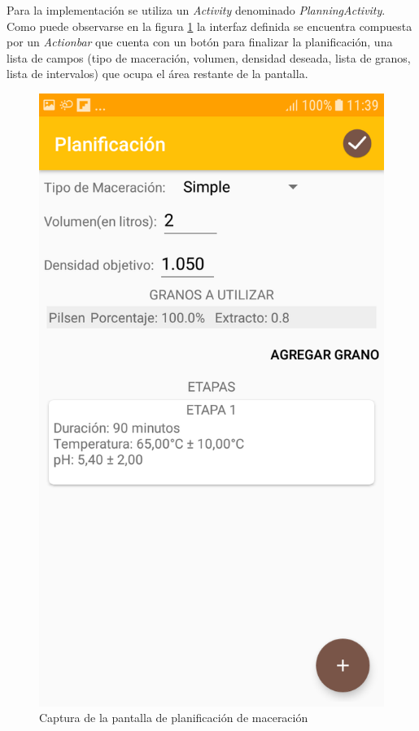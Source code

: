                 \par Para la implementación se utiliza un \textit{Activity} denominado \textit{PlanningActivity}. Como puede observarse en la figura \ref{fig:CapturaPlanAct} la interfaz definida se encuentra compuesta por un \textit{Actionbar} que cuenta con un botón para finalizar la planificación, una lista de campos (tipo de maceración, volumen, densidad deseada, lista de granos, lista de intervalos) que ocupa el área restante de la pantalla.
                \begin{figure}[h]
                    \centering
                    \includegraphics[scale=0.2]{software/ScreenCapture/PlanningActivity.jpg}
                    \caption{Captura de la pantalla de planificación de maceración}
                    \label{fig:CapturaPlanAct}
                \end{figure}
